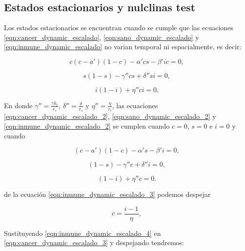 \documentclass{article}
\begin{document}
\subsection{Estados estacionarios y nulclinas test}

Los estados estacionarios se encuentran cuando se cumple que las ecuaciones \ref{eqn:cancer_dynamic_escalado}, \ref{eqn:sano_dynamic_escalado} y \ref{eqn:inmune_dynamic_escalado} no varian temporal ni espacialmente, es decir:

\begin{equation}
    c (c - a')(1-c) - \alpha' cs - \beta' i c = 0,
    \label{eqn:cancer_dynamic_escalado_2}
\end{equation}

\begin{equation}
     s (1 - s)  - \gamma'' cs + \delta'' si = 0,
    \label{eqn:sano_dynamic_escalado_2}
\end{equation}


\begin{equation}
    i(1-i) + \eta'' ci = 0.
    \label{eqn:inmune_dynamic_escalado_2}
\end{equation}

En donde $\gamma'' = \frac{\gamma k_c}{r_s}$,  $\delta'' = \frac{\delta}{r_s}$ y $\eta'' = \frac{\eta}{r_i}$,  las ecuaciones \ref{eqn:cancer_dynamic_escalado_2}, \ref{eqn:sano_dynamic_escalado_2} y \ref{eqn:inmune_dynamic_escalado_2} se cumplen cuando $c=0$, $s=0$ e $i=0$ y cuando 

\begin{equation}
    (c - a')(1-c) - \alpha' s - \beta' i  = 0,
    \label{eqn:cancer_dynamic_escalado_3}
\end{equation}

\begin{equation}
    (1 - s)  - \gamma'' c + \delta'' i = 0,
    \label{eqn:sano_dynamic_escalado_3}
\end{equation}


\begin{equation}
    (1-i) + \eta'' c = 0.
    \label{eqn:inmune_dynamic_escalado_3}
\end{equation}

de la ecuación  \ref{eqn:inmune_dynamic_escalado_3} podemos despejar

\begin{equation}
    c =  \frac{ i-1}{\eta},
    \label{eqn:inmune_dynamic_escalado_4}
\end{equation}

Sustituyendo \ref{eqn:inmune_dynamic_escalado_4} en \ref{eqn:cancer_dynamic_escalado_3} y despejando tendremos:
\end{document}
